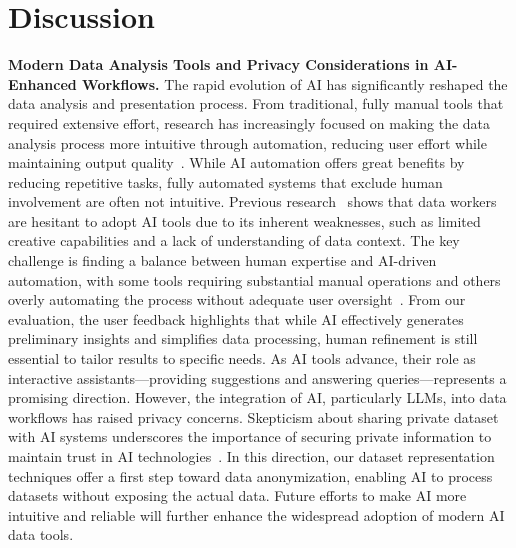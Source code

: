 \section{Discussion}




\textbf{Modern Data Analysis Tools and Privacy Considerations in AI- Enhanced Workflows.} 
The rapid evolution of AI has significantly reshaped the data analysis and presentation process. From traditional, fully manual tools that required extensive effort, research has increasingly focused on making the data analysis process more intuitive through automation, reducing user effort while maintaining output quality~\cite{grudin2009ai}. While AI automation offers great benefits by reducing repetitive tasks, fully automated systems that exclude human involvement are often not intuitive. Previous research~\cite{li2023ai} shows that data workers are hesitant to adopt AI tools due to its inherent weaknesses, such as limited creative capabilities and a lack of understanding of data context. The key challenge is finding a balance between human expertise and AI-driven automation, with some tools requiring substantial manual operations and others overly automating the process without adequate user oversight~\cite{wu2021ai4vis}. From our evaluation, the user feedback highlights that while AI effectively generates preliminary insights and simplifies data processing, human refinement is still essential to tailor results to specific needs. As AI tools advance, their role as interactive assistants—providing suggestions and answering queries—represents a promising direction. However, the integration of AI, particularly LLMs, into data workflows has raised privacy concerns. Skepticism about sharing private dataset with AI systems underscores the importance of securing private information to maintain trust in AI technologies~\cite{Gal,9152761,brown2022does,Gurman_2023}. In this direction, our dataset representation techniques offer a first step toward data anonymization, enabling AI to process datasets without exposing the actual data. Future efforts to make AI more intuitive and reliable will further enhance the widespread adoption of modern AI data tools.


